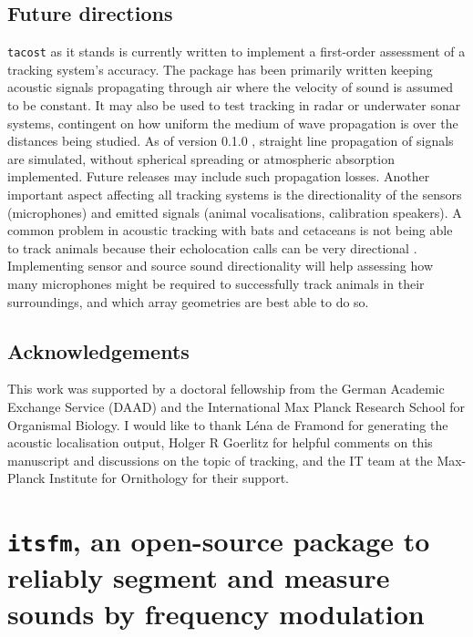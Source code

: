 \documentclass[
]{book}
\begin{document}
\hypertarget{future-directions}{%
\section{Future directions}\label{future-directions}}

\texttt{tacost} as it stands is currently written to implement a first-order assessment of a tracking system's accuracy. The package has been primarily written keeping acoustic signals propagating through air where the velocity of sound is assumed to be constant. It may also be used to test tracking in radar or underwater sonar systems, contingent on how uniform the medium of wave propagation is over the distances being studied. As of version 0.1.0
, straight line propagation of signals are simulated, without spherical spreading or atmospheric absorption implemented. Future releases may include such propagation losses. Another important aspect affecting all tracking systems is the directionality of the sensors (microphones) and emitted signals (animal vocalisations, calibration speakers). A common problem in acoustic tracking with bats and cetaceans is not being able to track animals because their echolocation calls can be very directional \citep{Matsuta2013, Surlykke2012, Koblitz2016}. Implementing sensor and source sound directionality will help assessing how many microphones might be required to successfully track animals in their surroundings, and which array geometries are best able to do so.

\hypertarget{acknowledgements-4}{%
\section{Acknowledgements}\label{acknowledgements-4}}

This work was supported by a doctoral fellowship from the German Academic Exchange Service (DAAD) and the International Max Planck Research School for Organismal Biology.
I would like to thank Léna de Framond for generating the acoustic localisation output, Holger R Goerlitz for helpful comments on this manuscript and discussions on the topic of tracking, and the IT team at the Max-Planck Institute for Ornithology for their support.

\hypertarget{itsfmchapter}{%
\chapter{\texorpdfstring{\texttt{itsfm}, an open-source package to reliably segment and measure sounds by frequency modulation}{itsfm, an open-source package to reliably segment and measure sounds by frequency modulation}}\label{itsfmchapter}}
\end{document}
